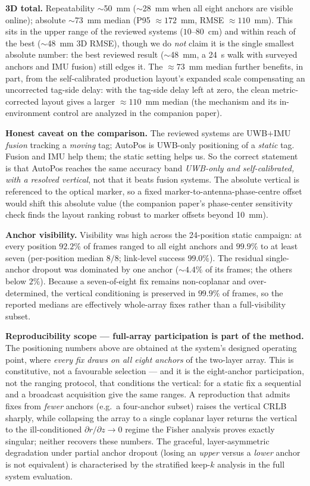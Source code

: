 \documentclass[11pt,a4paper]{article}
\begin{document}
\textbf{3D total.} Repeatability $\sim$50~mm ($\sim$28~mm when all eight anchors are visible online);
absolute $\sim$73~mm median (P95 ${\approx}172$~mm, RMSE ${\approx}110$~mm). This sits in the upper range of the reviewed systems
($10$--$80$~cm) and within reach of the best ($\sim$48~mm 3D RMSE), though we do \emph{not} claim it
is the single smallest absolute number: the best reviewed result ($\sim$48~mm, a 24~s walk with
surveyed anchors and IMU fusion) still edges it. The ${\approx}73$~mm median further benefits, in part,
from the self-calibrated production layout's expanded scale compensating an uncorrected tag-side
delay: with the tag-side delay left at zero, the clean metric-corrected layout gives a larger
${\approx}110$~mm median (the mechanism and its in-environment control are analyzed in the companion paper).

\textbf{Honest caveat on the comparison.} The reviewed systems are UWB$+$IMU \emph{fusion} tracking a
\emph{moving} tag; AutoPos is UWB-only positioning of a \emph{static} tag. Fusion and IMU help them;
the static setting helps us. So the correct statement is that AutoPos reaches the same accuracy band
\emph{UWB-only and self-calibrated, with a resolved vertical}, not that it beats fusion systems. The
absolute vertical is referenced to the optical marker, so a fixed marker-to-antenna-phase-centre offset
would shift this absolute value (the companion paper's phase-center sensitivity check finds the layout
ranking robust to marker offsets beyond 10~mm).

\textbf{Anchor visibility.} Visibility was high across the 24-position static campaign: at every position
$92.2\%$ of frames ranged to all eight anchors and $99.9\%$ to at least seven (per-position median
$8/8$; link-level success $99.0\%$). The residual single-anchor dropout was dominated by
one anchor (${\sim}4.4\%$ of its frames; the others below $2\%$). Because a seven-of-eight fix remains
non-coplanar and over-determined, the vertical conditioning is preserved in $99.9\%$ of frames, so the
reported medians are effectively whole-array fixes rather than a full-visibility subset.

\textbf{Reproducibility scope --- full-array participation is part of the method.} The positioning
numbers above are obtained at the system's designed operating point, where \emph{every fix draws on
all eight anchors} of the two-layer array. This is constitutive, not a favourable selection --- and it
is the eight-anchor participation, not the ranging protocol, that conditions the vertical: for a static
fix a sequential and a broadcast acquisition give the same ranges. A reproduction that admits fixes
from \emph{fewer} anchors (e.g.\ a four-anchor subset) raises the vertical CRLB sharply, while collapsing
the array to a single coplanar layer returns the vertical to the ill-conditioned
$\partial r/\partial z \to 0$ regime the Fisher analysis proves exactly singular; neither recovers these
numbers. The graceful, layer-asymmetric degradation under partial anchor dropout (losing an
\emph{upper} versus a \emph{lower} anchor is not equivalent) is characterised by the stratified
keep-$k$ analysis in the full system evaluation.
\end{document}
